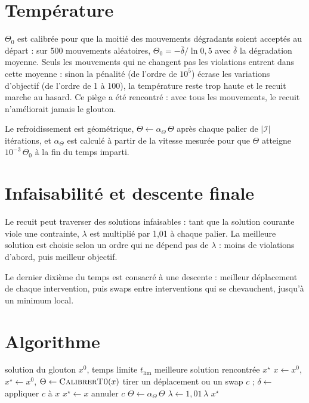 \documentclass[11pt,a4paper]{report}
\newcommand{\I}{\mathcal{I}}
\begin{document}
\section{Température}

$\Theta_0$ est calibrée pour que la moitié des mouvements dégradants soient acceptés au départ : sur
500 mouvements aléatoires, $\Theta_0 = -\bar\delta / \ln 0{,}5$ avec $\bar\delta$ la dégradation
moyenne. Seuls les mouvements qui ne changent pas les violations entrent dans cette moyenne : sinon
la pénalité (de l'ordre de $10^5$) écrase les variations d'objectif (de l'ordre de 1 à 100), la
température reste trop haute et le recuit marche au hasard. Ce piège a été rencontré : avec tous les
mouvements, le recuit n'améliorait jamais le glouton.

Le refroidissement est géométrique, $\Theta \gets \alpha_\Theta \, \Theta$ après chaque palier de
$|\I|$ itérations, et $\alpha_\Theta$ est calculé à partir de la vitesse mesurée pour que $\Theta$
atteigne $10^{-3} \, \Theta_0$ à la fin du temps imparti.

\section{Infaisabilité et descente finale}

Le recuit peut traverser des solutions infaisables : tant que la solution courante viole une
contrainte, $\lambda$ est multiplié par 1,01 à chaque palier. La meilleure solution est choisie selon
un ordre qui ne dépend pas de $\lambda$ : moins de violations d'abord, puis meilleur objectif.

Le dernier dixième du temps est consacré à une descente : meilleur déplacement de chaque
intervention, puis swaps entre interventions qui se chevauchent, jusqu'à un minimum local.

\section{Algorithme}

\begin{algorithm}[H]
\caption{\textsc{Recuit}$(x^0, t_{\lim})$}
\begin{algorithmic}[1]
\Require solution du glouton $x^0$, temps limite $t_{\lim}$
\Ensure meilleure solution rencontrée $x^\star$
\State $x \gets x^0$, \quad $x^\star \gets x^0$, \quad $\Theta \gets \textsc{CalibrerT0}(x)$
  \For{$k = 1$ \textbf{à} $|\I|$} 
    \State tirer un déplacement ou un swap $c$ ; $\delta \gets$ appliquer $c$ à $x$ 
       $x^\star \gets x$ \EndIf
    \Else
      \State annuler $c$
    \EndIf
  \EndFor
  \State $\Theta \gets \alpha_\Theta \, \Theta$
   $\lambda \gets 1{,}01 \, \lambda$ \EndIf
\EndWhile
\State \Return $x^\star$
\end{algorithmic}
\end{algorithm}
\end{document}
